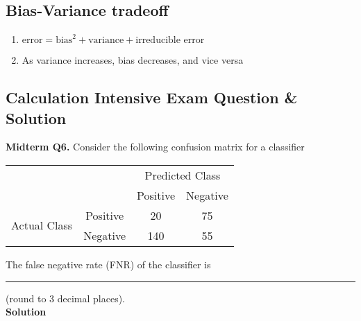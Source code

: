 \documentclass[../../dsa1101_notes.Rtex]{subfiles}\usepackage[]{graphicx}\usepackage[]{color}
\begin{document}
\subsection{Bias-Variance tradeoff}
\begin{enumerate}
    \item \(\text{error} = \text{bias}^2 + \text{variance} + \text{irreducible error}\)
    \item As variance increases, bias decreases, and vice versa
\end{enumerate}

\subsection{Calculation Intensive Exam Question \& Solution}
\textbf{Midterm Q6.} Consider the following confusion matrix for a classifier
\begin{center}
\begin{tabular}{|c|c|c|c|}
\cline{3-4}
\multicolumn{2}{c}{} & \multicolumn{2}{|c|}{Predicted Class}\\
\cline{3-4}
\multicolumn{2}{c}{} & \multicolumn{1}{|c|}{Positive} & Negative\\
\hline
\multirow{2}{3em}{Actual Class} & \multicolumn{1}{c}{Positive} & \multicolumn{1}{|c|}{20} & 75\\
\cline{2-4}
& \multicolumn{1}{c}{Negative} & \multicolumn{1}{|c|}{140} & 55\\
\hline
\end{tabular}
\end{center}
The false negative rate (FNR) of the classifier is \rule{1cm}{0.15mm} (round to 3 decimal places).\\
\textbf{Solution}
\end{document}
